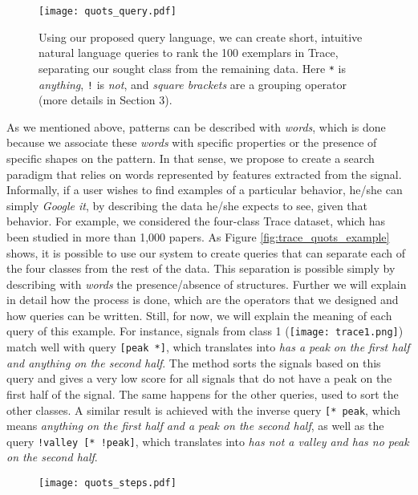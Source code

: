{\begin{figure}
    \centering
    \texttt{[image: quots\_query.pdf]}
    \caption{Using our proposed query language, we can create short, intuitive natural language queries to rank the 100 exemplars in Trace, separating our sought class from the remaining data. Here \texttt{*} is \textit{anything}, \texttt{!} is \textit{not}, and \textit{square brackets} are a grouping operator (more details in Section 3).}
    \label{fig:query_cold_start}
\end{figure}

As we mentioned above, patterns can be described with \textit{words}, which is done because we associate these \textit{words} with specific properties or the presence of specific shapes on the pattern. In that sense, we propose to create a search paradigm that relies on words represented by features extracted from the signal. Informally, if a user wishes to find examples of a particular behavior, he/she can simply \textit{Google it}, by describing the data he/she expects to see, given that behavior. For example, we considered the four-class Trace dataset, which has been studied in more than 1,000 papers. As Figure \ref{fig:trace_quots_example} shows, it is possible to use our system to create queries that can separate each of the four classes from the rest of the data. This separation is possible simply by describing with \textit{words} the presence/absence of structures. Further we will explain in detail how the process is done, which are the operators that we designed and how queries can be written. Still, for now, we will explain the meaning of each query of this example. For instance, signals from class 1 (\texttt{[image: trace1.png]}) match well with query \texttt{[peak *]}, which translates into \textit{has a peak on the first half and anything on the second half}. The method sorts the signals based on this query and gives a very low score for all signals that do not have a peak on the first half of the signal. The same happens for the other queries, used to sort the other classes. A similar result is achieved with the inverse query \texttt{[* peak}, which means \textit{anything on the first half and a peak on the second half}, as well as the  query \texttt{!valley [* !peak]}, which translates into \textit{has not a valley and has no peak on the second half}.

\begin{figure}
\centering
\texttt{[image: quots\_steps.pdf]}
\label{fig:quots_steps}
\caption{}
\end{figure}

}
